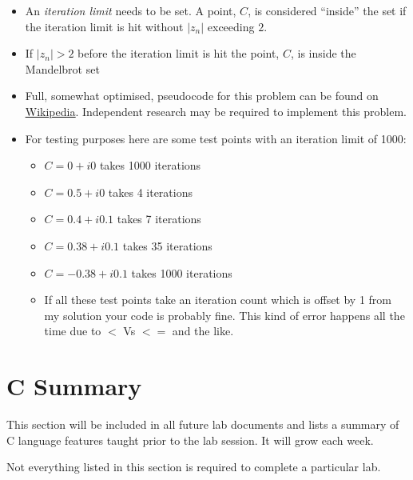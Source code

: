\documentclass{lab}
\begin{document}
\begin{itemize}[itemsep=0mm]
\item An \textit{iteration limit} needs to be set. A point, $C$, is considered ``inside'' the set if the iteration limit is hit without $\left|z_n\right|$ exceeding $2$.
\item If $\left|z_n\right| > 2$ before the iteration limit is hit the point, $C$, is inside the Mandelbrot set
\item Full, somewhat optimised, pseudocode for this problem can be found on \underline{\href{https://en.wikipedia.org/wiki/Mandelbrot_set}{Wikipedia}}. Independent research may be required to implement this problem.
\item For testing purposes here are some test points with an iteration limit of 1000:
	\begin{itemize}
		\item $C = 0 + i0$ takes 1000 iterations
		\item $C = 0.5 + i0$ takes 4 iterations
		\item $C = 0.4 +i0.1$ takes 7 iterations
		\item $C = 0.38 +i0.1$ takes 35 iterations
		\item $C = -0.38 +i0.1$ takes 1000 iterations
		\item If all these test points take an iteration count which is offset by 1 from my solution your code is probably fine. This kind of error happens all the time due to $<$ Vs $<=$ and the like.
	\end{itemize}
\end{itemize}


\pagebreak 
\section{C Summary}
This section will be included in all future lab documents and lists a summary of C language features taught prior to the lab session. It will grow each week.

Not everything listed in this section is required to complete a particular lab.
\end{document}
